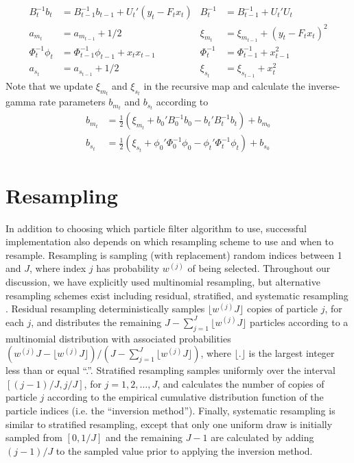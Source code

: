 \begin{align}
B_t^{-1}b_t &= B_{t-1}^{-1}b_{t-1} + U_t'(y_t - F_tx_t) & B_t^{-1} &= B_{t-1}^{-1} + U_t'U_t \label{eqn:pl:dr:suff} \\
a_{m_t} &= a_{m_{t-1}} + 1/2 & \xi_{m_t} &= \xi_{m_{t-1}} + (y_t - F_tx_t)^2 \nonumber \\
\Phi_t^{-1}\phi_t &= \Phi_{t-1}^{-1}\phi_{t-1} + x_tx_{t-1} & \Phi_t^{-1} &= \Phi_{t-1}^{-1} + x_{t-1}^2 \nonumber \\
a_{s_t} &= a_{s_{t-1}} + 1/2 & \xi_{s_t} &= \xi_{s_{t-1}} + x_t^2 \nonumber
\end{align}
Note that we update $\xi_{m_t}$ and $\xi_{s_t}$ in the recursive map and calculate the inverse-gamma rate parameters $b_{m_t}$ and $b_{s_t}$ according to
\begin{align}
b_{m_t} &= \frac{1}{2}\left(\xi_{m_t} + b_0'B_0^{-1}b_0 - b_t'B_t^{-1}b_t\right) + b_{m_0} \label{eqn:pl:dr:rate} \\
b_{s_t} &= \frac{1}{2}\left(\xi_{s_t} + \phi_0'\Phi_0^{-1}\phi_0 - \phi_t'\Phi_t^{-1}\phi_t\right) + b_{s_0} \nonumber
\end{align}

\section{Resampling \label{sec:resample}}

In addition to choosing which particle filter algorithm to use, successful implementation also depends on which resampling scheme to use and when to resample. Resampling is sampling (with replacement) random indices between 1 and $J$, where index $j$ has probability $w^{(j)}$ of being selected. Throughout our discussion, we have explicitly used multinomial resampling, but alternative resampling schemes exist including residual, stratified, and systematic resampling \citep{Douc:Capp:Moul:comp:2005}. Residual resampling deterministically samples $\lfloor w^{(j)} J \rfloor$ copies of particle $j$, for each $j$, and distributes the remaining $J - \sum^J_{j=1} \lfloor w^{(j)} J \rfloor$  particles according to a multinomial distribution with associated probabilities $(w^{(j)} J - \lfloor w^{(j)} J \rfloor) / (J - \sum^J_{j=1} \lfloor w^{(j)} J \rfloor)$, where $\lfloor . \rfloor$ is the largest integer less than or equal ``.''. Stratified resampling samples uniformly over the interval $[(j-1) / J, j / J]$, for $j = 1, 2, \ldots, J$, and calculates the number of copies of particle $j$ according to the empirical cumulative distribution function of the particle indices (i.e. the ``inversion method''). Finally, systematic resampling is similar to stratified resampling, except that only one uniform draw is initially sampled from $[0, 1/J]$ and the remaining $J-1$ are calculated by adding $(j-1) / J$ to the sampled value prior to applying the inversion method.

